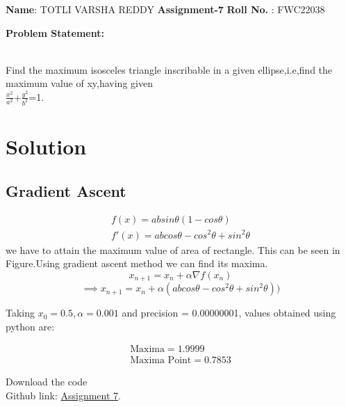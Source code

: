\documentclass[10pt,a4paper]{report}
\begin{document}
\raggedright \textbf{Name}:\hspace{1mm} TOTLI VARSHA REDDY\hspace{3cm} \Large \textbf{Assignment-7}\hspace{2.5cm} 
\normalsize \textbf{Roll No.} :\hspace{1mm} FWC22038\vspace{1cm}
\begin{multicols}{2}

\raggedright \textbf{Problem Statement:}\vspace{2mm}
\raggedright \\Find the maximum isosceles triangle inscribable in a given ellipse,i.e,find the maximum value of xy,having given\\
\large{$ \frac{x^2}{a^2}$+$\frac{y^2}{b^2}$=1.}\\
\vspace{5mm}
\section*{\large Solution}
    \subsection*{\normalsize Gradient Ascent}
    \begin{align}
	\label{eq:vol_varx}
	f(x) = absin\theta(1-cos\theta)\\
    f'(x) = abcos\theta-cos^2\theta+sin^2\theta
	\end{align}
we have to attain the maximum value of area of rectangle. This can be seen in Figure.Using gradient ascent method we can find its maxima.
\begin{equation}
        x_{n+1} = x_n + \alpha \nabla f(x_n) 
\end{equation}
\vspace{1mm}
\begin{equation}
\implies x_{n+1}=x_n+\alpha(abcos\theta-cos^2\theta+sin^2\theta))
\end{equation}

Taking $x_0=0.5,\alpha=0.001$ and precision = 0.00000001, values obtained using python are:
    

    \begin{align}
        \boxed{\text{Maxima} = 1.9999}\\     
        \boxed{\text{Maxima Point} = 0.7853}
    \end{align}
\raggedright  Download the code \\
Github link: \href{https://github.com/9705701645/FWC/blob/main/optm1.py}{Assignment 7}.
  \end{multicols}
\end{document}
